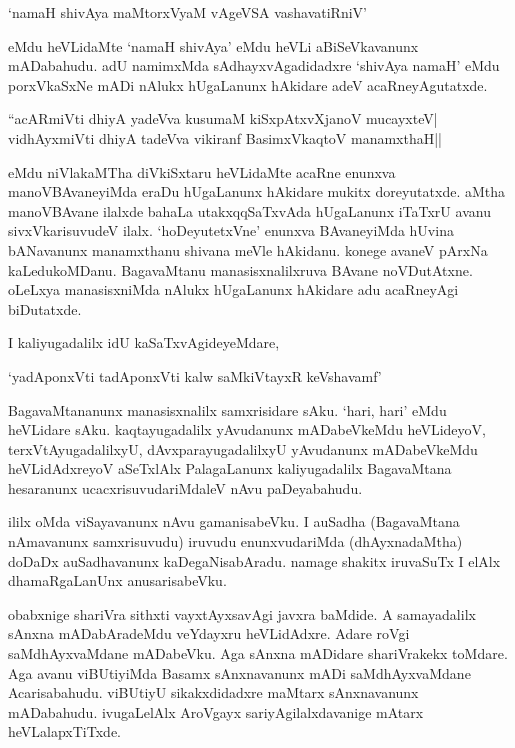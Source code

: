 \begin{shloka}
`namaH shivAya maMtorxV\s yaM vAgeVSA vashavatiRniV'
\end{shloka}

\noindent eMdu heVLidaMte `namaH shivAya' eMdu heVLi aBiSeVkavanunx mADabahudu. adU namimxMda sAdhayxvAgadidadxre `shivAya namaH' eMdu porxVkaSxNe mADi nAlukx hUgaLanunx hAkidare adeV acaRneyAgutatxde.

\begin{shloka}
``acARmiVti dhiyA yadeVva kusumaM kiSxpAtxvXjanoV mucayxteV|\\
vidhAyxmiVti dhiyA tadeVva vikiranf BasimxVkaqtoV manamxthaH||
\end{shloka}

\noindent eMdu niVlakaMTha diVkiSxtaru heVLidaMte acaRne enunxva manoVBAvaneyiMda eraDu hUgaLanunx hAkidare mukitx doreyutatxde. aMtha manoVBAvane ilalxde bahaLa utakxqqSaTxvAda hUgaLanunx iTaTxrU avanu sivxVkarisuvudeV ilalx. `hoDeyutetxVne' enunxva BAvaneyiMda hUvina bANavanunx manamxthanu shivana meVle hAkidanu. konege avaneV pArxNa kaLedukoMDanu. BagavaMtanu manasisxnalilxruva BAvane noVDutAtxne. oLeLxya manasisxniMda nAlukx hUgaLanunx hAkidare adu acaRneyAgi biDutatxde.

I kaliyugadalilx idU kaSaTxvAgideyeMdare,

\begin{shloka}
`yadAponxVti tadAponxVti kalw saMkiVtayxR keVshavamf'
\end{shloka}

BagavaMtananunx manasisxnalilx samxrisidare sAku. `hari, hari' eMdu heVLidare sAku. kaqtayugadalilx yAvudanunx mADabeVkeMdu heVLideyoV, terxVtAyugadalilxyU,  dAvxparayugadalilxyU yAvudanunx mADabeVkeMdu heVLidAdxreyoV aSeTxlAlx PalagaLanunx kaliyugadalilx BagavaMtana hesaranunx ucacxrisuvudariMdaleV nAvu paDeyabahudu.

ililx oMda viSayavanunx nAvu gamanisabeVku. I auSadha (BagavaMtana nAmavanunx samxrisuvudu) iruvudu enunxvudariMda (dhAyxnadaMtha) doDaDx auSadhavanunx kaDegaNisabAradu. namage shakitx iruvaSuTx I elAlx dhamaRgaLanUnx anusarisabeVku.

obabxnige shariVra sithxti vayxtAyxsavAgi javxra baMdide. A samayadalilx sAnxna mADabAradeMdu veYdayxru heVLidAdxre. Adare roVgi saMdhAyxvaMdane mADabeVku. Aga sAnxna mADidare shariVrakekx toMdare. Aga avanu viBUtiyiMda Basamx sAnxnavanunx mADi saMdhAyxvaMdane Acarisabahudu. viBUtiyU sikakxdidadxre maMtarx sAnxnavanunx mADabahudu. ivugaLelAlx AroVgayx sariyAgilalxdavanige mAtarx heVLalapxTiTxde.

